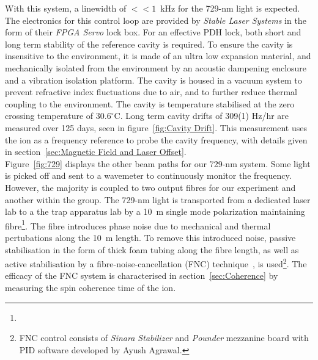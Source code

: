     With this system, a linewidth of $<<1$~kHz for the 729-nm light is expected. 
    The electronics for this control loop are
    provided by \emph{Stable Laser Systems} in the form of their \emph{FPGA Servo}
    lock box. For an effective PDH lock, both short and long term
    stability of the reference cavity is required. To ensure the cavity is insensitive to
    the environment, it is made of an ultra low expansion material, and mechanically isolated from the environment by an acoustic dampening enclosure and a vibration isolation platform. The cavity is housed in a vacuum system to prevent refractive index fluctuations due to air, and to further reduce thermal coupling to the environment. 
    The cavity is temperature stabilised at the zero crossing temperature of
    $30.6^\circ$C. Long term cavity drifts of 309(1) Hz/hr are measured over
    125 days, seen in figure~\ref{fig:Cavity Drift}. This measurement uses the ion as a
    frequency reference to probe the cavity frequency, with details given in section~\ref{sec:Magnetic Field and Laser Offset}.\\
    Figure~\ref{fig:729} displays the other beam paths for our 729-nm system.
    Some light is picked off and sent to a wavemeter to continuously monitor the
    frequency. However, the majority is coupled to two output fibres for our
    experiment and another within the group. The 729-nm light is transported from
    a dedicated laser lab to a the trap apparatus lab by a 10~m
    single mode polarization maintaining fibre\footnote{}.  The fibre
    introduces phase noise due to mechanical and thermal pertubations along the 10~m
    length. To remove this introduced noise, passive stabilisation in
    the form of thick foam tubing along the fibre length, as well as active
    stabilisation by a fibre-noise-cancellation (FNC) technique~\cite{ma_delivering_1994}, is used\footnote{FNC control consists of \emph{Sinara Stabilizer} and \emph{Pounder}
    mezzanine board with PID software 
    developed by Ayush Agrawal.}. The efficacy of the FNC system is characterised in section~\ref{sec:Coherence} by measuring the spin coherence time of the ion.\\



